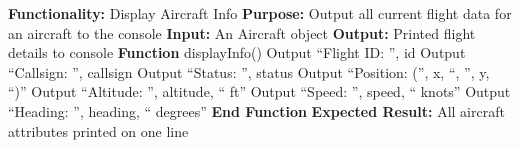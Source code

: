\documentclass[a4paper,11pt]{article}
\begin{document}
\begin{algorithm}
\caption{Display Aircraft Information}
\begin{algorithmic}[1]
\State \textbf{Functionality:} Display Aircraft Info
\State \textbf{Purpose:} Output all current flight data for an aircraft to the console
\State \textbf{Input:} An Aircraft object
\State \textbf{Output:} Printed flight details to console
\vspace{0.3cm}
\State \textbf{Function} displayInfo()
\State \hspace{1cm} Output ``Flight ID: '', id
\State \hspace{1cm} Output ``Callsign: '', callsign
\State \hspace{1cm} Output ``Status: '', status
\State \hspace{1cm} Output ``Position: ('', x, ``, '', y, ``)''
\State \hspace{1cm} Output ``Altitude: '', altitude, `` ft''
\State \hspace{1cm} Output ``Speed: '', speed, `` knots''
\State \hspace{1cm} Output ``Heading: '', heading, `` degrees''
\State \textbf{End Function}
\State \textbf{Expected Result:} All aircraft attributes printed on one line
\end{algorithmic}
\end{algorithm}
\end{document}
